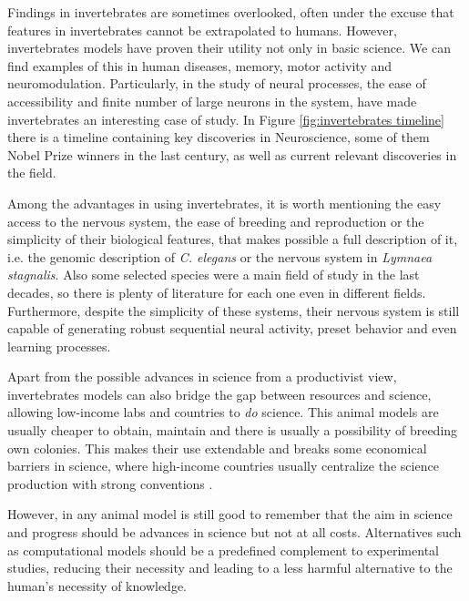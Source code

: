 Findings in invertebrates are sometimes overlooked, often under the excuse that features in invertebrates cannot be extrapolated to humans. However, invertebrates  models  have proven their utility not only in basic science. We can find examples of this in human diseases, memory, motor activity and neuromodulation. Particularly, in the study of neural processes, the ease of accessibility and finite number of large neurons in the system, have made invertebrates an interesting case of study. In Figure \ref{fig:invertebrates timeline} there is a timeline containing key discoveries in Neuroscience, some of them Nobel Prize winners in the last century, as well as current relevant discoveries in the field. 

Among the advantages in using invertebrates, it is worth mentioning the easy access to the nervous system, the ease of breeding and reproduction or the simplicity of their biological features, that makes possible a full description of it, i.e. the genomic description of \textit{C. elegans} or the nervous system in \textit{Lymnaea stagnalis}. Also some selected species were a main field of study in the last decades, so there is plenty of literature for each one even in different fields. Furthermore, despite the simplicity of these systems, their nervous system is still capable of generating robust sequential neural activity, preset behavior and even learning processes. 


Apart from the possible advances in science from a productivist view, invertebrates models can also bridge the gap between resources and science, allowing low-income labs and countries to \textit{do} science. This animal models are usually cheaper to obtain, maintain and there is usually a possibility of breeding own colonies. This makes their use extendable and breaks some economical barriers in science, where high-income countries usually centralize the science production with strong conventions \parencite{castillo_spineless_2017,stephan_how_2015}. 


However, in any animal model is still good to remember that the aim in science and progress should be advances in science but not at all costs. Alternatives such as computational models should be a predefined complement to experimental studies, reducing their necessity and leading to a less harmful alternative to the human's necessity of knowledge. 


